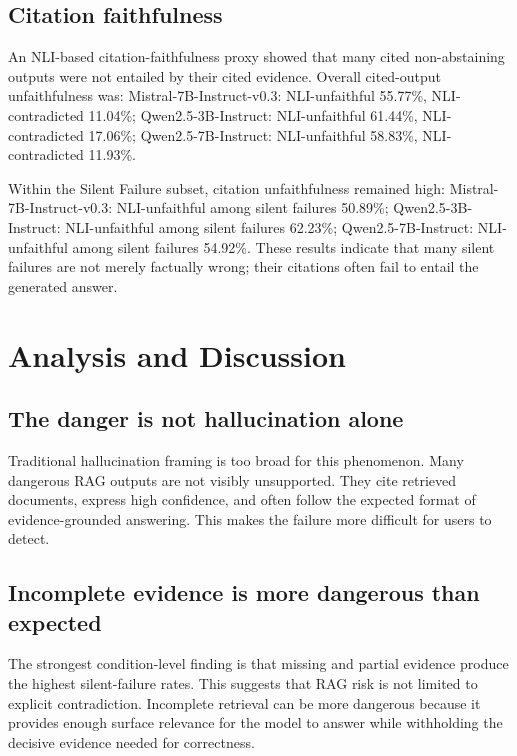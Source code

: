 \subsection{Citation faithfulness}

An NLI-based citation-faithfulness proxy showed that many cited non-abstaining outputs were not entailed by their cited evidence. Overall cited-output unfaithfulness was: Mistral-7B-Instruct-v0.3: NLI-unfaithful 55.77\%, NLI-contradicted 11.04\%; Qwen2.5-3B-Instruct: NLI-unfaithful 61.44\%, NLI-contradicted 17.06\%; Qwen2.5-7B-Instruct: NLI-unfaithful 58.83\%, NLI-contradicted 11.93\%.

Within the Silent Failure subset, citation unfaithfulness remained high: Mistral-7B-Instruct-v0.3: NLI-unfaithful among silent failures 50.89\%; Qwen2.5-3B-Instruct: NLI-unfaithful among silent failures 62.23\%; Qwen2.5-7B-Instruct: NLI-unfaithful among silent failures 54.92\%. These results indicate that many silent failures are not merely factually wrong; their citations often fail to entail the generated answer.



\section{Analysis and Discussion}



\subsection{The danger is not hallucination alone}

Traditional hallucination framing is too broad for this phenomenon. Many dangerous RAG outputs are not visibly unsupported. They cite retrieved documents, express high confidence, and often follow the expected format of evidence-grounded answering. This makes the failure more difficult for users to detect.



\subsection{Incomplete evidence is more dangerous than expected}

The strongest condition-level finding is that missing and partial evidence produce the highest silent-failure rates. This suggests that RAG risk is not limited to explicit contradiction. Incomplete retrieval can be more dangerous because it provides enough surface relevance for the model to answer while withholding the decisive evidence needed for correctness.



